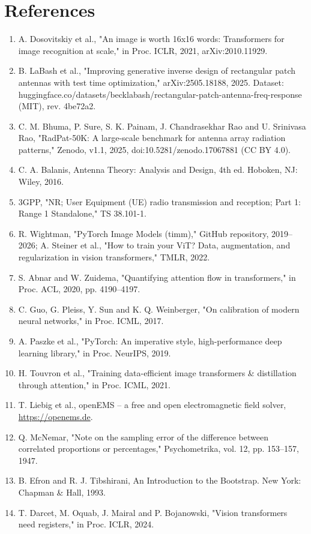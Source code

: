 \documentclass[11pt,a4paper]{article}
\begin{document}
\section*{References}
\begin{enumerate}[leftmargin=*,itemsep=1pt]
\item A. Dosovitskiy et al., "An image is worth 16x16 words: Transformers for image recognition at scale," in Proc. ICLR, 2021, arXiv:2010.11929.
\item B. LaBash et al., "Improving generative inverse design of rectangular patch antennas with test time optimization," arXiv:2505.18188, 2025. Dataset: huggingface.co/datasets/becklabash/rectangular-patch-antenna-freq-response (MIT), rev. 4be72a2.
\item C. M. Bhuma, P. Sure, S. K. Painam, J. Chandrasekhar Rao and U. Srinivasa Rao, "RadPat-50K: A large-scale benchmark for antenna array radiation patterns," Zenodo, v1.1, 2025, doi:10.5281/zenodo.17067881 (CC BY 4.0).
\item C. A. Balanis, Antenna Theory: Analysis and Design, 4th ed. Hoboken, NJ: Wiley, 2016.
\item 3GPP, "NR; User Equipment (UE) radio transmission and reception; Part 1: Range 1 Standalone," TS 38.101-1.
\item R. Wightman, "PyTorch Image Models (timm)," GitHub repository, 2019--2026; A. Steiner et al., "How to train your ViT? Data, augmentation, and regularization in vision transformers," TMLR, 2022.
\item S. Abnar and W. Zuidema, "Quantifying attention flow in transformers," in Proc. ACL, 2020, pp. 4190--4197.
\item C. Guo, G. Pleiss, Y. Sun and K. Q. Weinberger, "On calibration of modern neural networks," in Proc. ICML, 2017.
\item A. Paszke et al., "PyTorch: An imperative style, high-performance deep learning library," in Proc. NeurIPS, 2019.
\item H. Touvron et al., "Training data-efficient image transformers \& distillation through attention," in Proc. ICML, 2021.
\item T. Liebig et al., openEMS -- a free and open electromagnetic field solver, \url{https://openems.de}.
\item Q. McNemar, "Note on the sampling error of the difference between correlated proportions or percentages," Psychometrika, vol. 12, pp. 153--157, 1947.
\item B. Efron and R. J. Tibshirani, An Introduction to the Bootstrap. New York: Chapman \& Hall, 1993.
\item T. Darcet, M. Oquab, J. Mairal and P. Bojanowski, "Vision transformers need registers," in Proc. ICLR, 2024.
\end{enumerate}
\newpage
\end{document}
